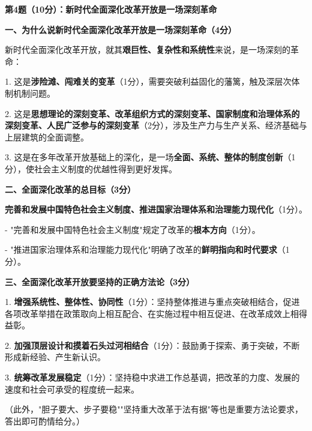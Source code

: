 \documentclass[12pt, a4paper]{article}
\begin{document}
\begin{answerbox}

\textbf{第4题（10分）：新时代全面深化改革开放是一场深刻革命}

\textbf{一、为什么说新时代全面深化改革开放是一场深刻革命（4分）}

新时代全面深化改革开放，就其\textbf{艰巨性、复杂性和系统性}来说，是一场深刻的革命：

1. 这是\textbf{涉险滩、闯难关的变革}（1分），需要突破利益固化的藩篱，触及深层次体制机制问题。

2. 这是\textbf{思想理论的深刻变革、改革组织方式的深刻变革、国家制度和治理体系的深刻变革、人民广泛参与的深刻变革}（2分），涉及生产力与生产关系、经济基础与上层建筑的全面调整。

3. 这是在多年改革开放基础上的深化，是一场\textbf{全面、系统、整体的制度创新}（1分），使社会主义制度的优越性得到更好发挥。

\textbf{二、全面深化改革的总目标（3分）}

\textbf{完善和发展中国特色社会主义制度、推进国家治理体系和治理能力现代化}（1分）。

- "完善和发展中国特色社会主义制度"规定了改革的\textbf{根本方向}（1分）。

- "推进国家治理体系和治理能力现代化"明确了改革的\textbf{鲜明指向和时代要求}（1分）。

\textbf{三、全面深化改革开放要坚持的正确方法论（3分）}

1. \textbf{增强系统性、整体性、协同性}（1分）：坚持整体推进与重点突破相结合，促进各项改革举措在政策取向上相互配合、在实施过程中相互促进、在改革成效上相得益彰。

2. \textbf{加强顶层设计和摸着石头过河相结合}（1分）：鼓励勇于探索、勇于突破，不断形成新经验、产生新认识。

3. \textbf{统筹改革发展稳定}（1分）：坚持稳中求进工作总基调，把改革的力度、发展的速度和社会可承受的程度统一起来。

（此外，"胆子要大、步子要稳""坚持重大改革于法有据"等也是重要方法论要求，答出即可酌情给分。）

\end{answerbox}

\vspace{6pt}
\end{document}
